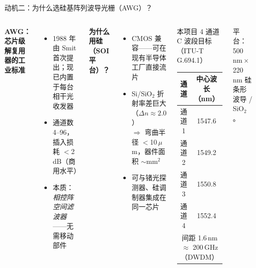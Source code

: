 \documentclass[aspectratio=169,10pt]{beamer}
\begin{document}
\begin{frame}{动机二：为什么选硅基阵列波导光栅（AWG）？}
  \begin{columns}[T]
      \textbf{AWG：芯片级解复用器的工业标准}\footnotemark[3]
      \begin{itemize}\setlength\itemsep{3pt}
        \item 1988 年由 Smit 首次提出；现已内置于每台相干光收发器
        \item 通道数 4--96，插入损耗 $<$2\,dB（商用水平）
        \item 本质：\emph{相控阵空间滤波器}——无需移动部件
      \end{itemize}
      \vspace{0.4em}
      \textbf{为什么用硅（SOI 平台）？}\footnotemark[4]
      \begin{itemize}\setlength\itemsep{3pt}
        \item CMOS 兼容——可在现有半导体工厂直接流片
        \item Si/SiO$_2$ 折射率差巨大（$\Delta n \approx 2.0$）\\
              $\Rightarrow$ 弯曲半径 $<$10\,$\mu$m，器件面积 $\sim$mm$^2$
        \item 可与锗光探测器、硅调制器集成在同一芯片
      \end{itemize}
      \begin{block}{本项目 4 通道 C 波段目标（ITU-T G.694.1\footnotemark[5]）}
        \centering\small
        \renewcommand{\arraystretch}{1.15}
        \begin{tabular}{cc}
          \toprule
          通道 & 中心波长（nm） \\
          \midrule
          通道 1 & 1547.6 \\
          通道 2 & 1549.2 \\
          通道 3 & 1550.8 \\
          通道 4 & 1552.4 \\
          \midrule
          \multicolumn{2}{c}{间距 1.6\,nm $\approx$ 200\,GHz（DWDM）}\\
          \bottomrule
        \end{tabular}
      \end{block}
      \vspace{0.3em}
      \small 平台：500\,nm\,$\times$\,220\,nm 硅条形波导 / SiO$_2$。
  \end{columns}
\end{frame}
\end{document}
